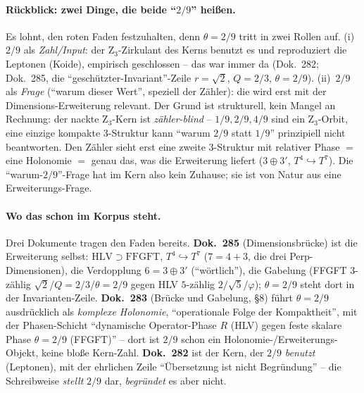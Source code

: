 \paragraph{Rückblick: zwei Dinge, die beide \enquote{$2/9$} heißen.} Es lohnt, den roten Faden
festzuhalten, denn $\theta=2/9$ tritt in zwei Rollen auf. (i)~$2/9$ als \emph{Zahl/Input}: der
Z$_3$-Zirkulant des Kerns benutzt es und reproduziert die Leptonen (Koide), empirisch geschlossen --
das war immer da (Dok.~282; Dok.~285, die \enquote{geschützter-Invariant}-Zeile $r=\sqrt2$, $Q=2/3$,
$\theta=2/9$). (ii)~$2/9$ als \emph{Frage} (\enquote{warum dieser Wert}, speziell der Zähler): die wird
erst mit der Dimensions-Erweiterung relevant. Der Grund ist strukturell, kein Mangel an Rechnung: der
nackte Z$_3$-Kern ist \emph{zähler-blind} -- $1/9,2/9,4/9$ sind ein Z$_3$-Orbit, eine einzige kompakte
$3$-Struktur kann \enquote{warum $2/9$ statt $1/9$} prinzipiell nicht beantworten. Den Zähler sieht erst
eine zweite $3$-Struktur mit relativer Phase $=$ eine Holonomie $=$ genau das, was die Erweiterung
liefert ($3\oplus3'$, $T^4\!\hookrightarrow\!T^7$). Die \enquote{warum-$2/9$}-Frage hat im Kern also kein
Zuhause; sie ist von Natur aus eine Erweiterungs-Frage.

\paragraph{Wo das schon im Korpus steht.} Drei Dokumente tragen den Faden bereits. \textbf{Dok.~285}
(Dimensionsbrücke) ist die Erweiterung selbst: $\mathrm{HLV}\supset\mathrm{FFGFT}$,
$T^4\hookrightarrow T^7$ ($7=4+3$, die drei Perp-Dimensionen), die Verdopplung $6=3\oplus3'$
(\enquote{wörtlich}), die Gabelung (FFGFT $3$-zählig $\sqrt2$/$Q=2/3$/$\theta=2/9$ gegen HLV $5$-zählig
$2/\sqrt5$/$\varphi$); $\theta=2/9$ steht dort in der Invarianten-Zeile. \textbf{Dok.~283} (Brücke und
Gabelung, §8) führt $\theta=2/9$ ausdrücklich als \emph{komplexe Holonomie}, \enquote{operationale Folge
der Kompaktheit}, mit der Phasen-Schicht \enquote{dynamische Operator-Phase $R$ (HLV) gegen feste
skalare Phase $\theta=2/9$ (FFGFT)} -- dort ist $2/9$ schon ein Holonomie-/Erweiterungs-Objekt, keine
bloße Kern-Zahl. \textbf{Dok.~282} ist der Kern, der $2/9$ \emph{benutzt} (Leptonen), mit der ehrlichen
Zeile \enquote{Übersetzung ist nicht Begründung} -- die Schreibweise \emph{stellt} $2/9$ dar,
\emph{begründet} es aber nicht.

